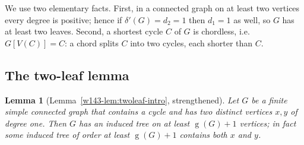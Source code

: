 \documentclass[11pt]{article}
\numberwithin{equation}{section}
\newtheorem{lemma}[theorem]{Lemma}
\theoremstyle{remark}
\newcommand{\gr}{\operatorname{g}}
\newcommand{\dd}{\delta'}
\begin{document}
We use two elementary facts.  First, in a connected graph on at least two
vertices every degree is positive; hence if $\dd(G)=d_2=1$ then $d_1=1$ as
well, so $G$ has at least two leaves.  Second, a shortest cycle $C$ of $G$ is
chordless, i.e.\ $G[V(C)]=C$: a chord splits $C$ into two cycles, each shorter
than $C$.

\subsection{The two-leaf lemma}

\begin{lemma}[Lemma~\ref{w143-lem:twoleaf-intro}, strengthened]\label{w143-lem:twoleaf}
Let $G$ be a finite simple connected graph that contains a cycle and has two
distinct vertices $x,y$ of degree one.  Then $G$ has an induced tree on at
least $\gr(G)+1$ vertices; in fact some induced tree of order at least
$\gr(G)+1$ contains both $x$ and $y$.
\end{lemma}
\end{document}
